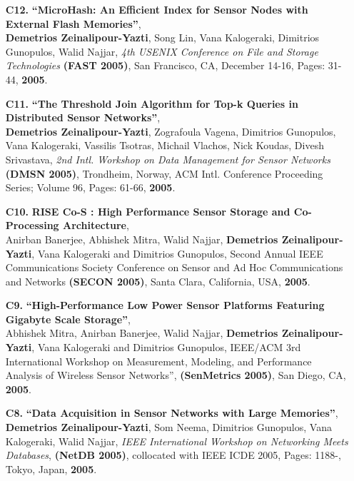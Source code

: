 \documentclass[10pt]{article}
\begin{document}
\begin{enumerate}
\item[{\bf C12.}]
 \label{C12} 
{\bf ``MicroHash: An Efficient Index for Sensor Nodes with External Flash Memories''}, \\
{\bf Demetrios Zeinalipour-Yazti}, Song Lin, Vana Kalogeraki, Dimitrios Gunopulos, Walid Najjar, 
{\em 4th USENIX Conference on File and Storage Technologies} {\bf (FAST 2005)},
San Francisco, CA, December 14-16, Pages: 31-44, {\bf 2005}.

\item[{\bf C11.}]
\label{C11} 
{\bf ``The Threshold Join Algorithm for Top-k Queries in Distributed Sensor Networks''},\\
{\bf Demetrios Zeinalipour-Yazti}, Zografoula Vagena, Dimitrios Gunopulos, Vana Kalogeraki, Vassilis Tsotras, Michail Vlachos, Nick Koudas, Divesh Srivastava, 
{\em 2nd Intl. Workshop on Data Management for Sensor Networks}
{\bf (DMSN 2005)}, Trondheim, Norway,
ACM Intl. Conference Proceeding Series; Volume 96, Pages: 61-66, {\bf 2005}.

\item[{\bf C10.}]
\label{C10}
{\bf RISE Co-S : High Performance Sensor Storage and Co-Processing Architecture}, \\
Anirban Banerjee, Abhishek Mitra, Walid Najjar, {\bf Demetrios Zeinalipour-Yazti}, Vana Kalogeraki and Dimitrios Gunopulos,  
Second Annual IEEE Communications Society Conference on Sensor and Ad Hoc Communications and Networks {\bf (SECON 2005)},
Santa Clara, California, USA, {\bf 2005}.

\item[{\bf C9.}]
\label{C9}
{\bf ``High-Performance Low Power Sensor Platforms Featuring Gigabyte Scale Storage''}, \\
Abhishek Mitra, Anirban Banerjee, Walid Najjar, {\bf Demetrios Zeinalipour-Yazti}, Vana Kalogeraki and Dimitrios Gunopulos,  
IEEE/ACM 3rd International Workshop on Measurement, Modeling, and Performance Analysis of Wireless Sensor Networks'', 
{\bf (SenMetrics 2005)}, San Diego, CA, {\bf 2005}.

\item[{\bf C8.}]
 \label{C8}
{\bf ``Data Acquisition in Sensor Networks with Large Memories''},\\
{\bf Demetrios Zeinalipour-Yazti}, Som Neema, Dimitrios Gunopulos, Vana Kalogeraki, Walid Najjar, 
{\em IEEE International Workshop on Networking Meets Databases},
{\bf (NetDB 2005)}, collocated with IEEE ICDE 2005, Pages: 1188-, Tokyo, Japan,  {\bf 2005}.


\end{enumerate}
\end{document}
